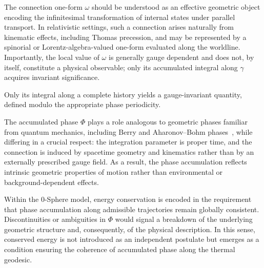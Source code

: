 \documentclass[%
 reprint,
 amsmath,amssymb,
 aps,
 prb,
]{revtex4-2}
\numberwithin{equation}{section}
\begin{document}
The connection one-form $\omega$ should be understood as an effective geometric object encoding the infinitesimal transformation of internal states under parallel transport.
In relativistic settings, such a connection arises naturally from kinematic effects, including Thomas precession, and may be represented by a spinorial or Lorentz-algebra-valued one-form evaluated along the worldline.
Importantly, the local value of $\omega$ is generally gauge dependent and does not, by itself, constitute a physical observable; only its accumulated integral along $\gamma$ acquires invariant significance.


Only its integral along a complete history yields a gauge-invariant quantity, defined modulo the appropriate phase periodicity.

The accumulated phase $\Phi$ plays a role analogous to geometric phases familiar from quantum mechanics, including Berry and Aharonov--Bohm phases~\cite{Berry1984}, while differing in a crucial respect: the integration parameter is proper time, and the connection is induced by spacetime geometry and kinematics rather than by an externally prescribed gauge field. 
As a result, the phase accumulation reflects intrinsic geometric properties of motion rather than environmental or background-dependent effects.

Within the 0-Sphere model, energy conservation is encoded in the requirement that phase accumulation along admissible trajectories remain globally consistent. 
Discontinuities or ambiguities in $\Phi$ would signal a breakdown of the underlying geometric structure and, consequently, of the physical description. 
In this sense, conserved energy is not introduced as an independent postulate but emerges as a condition ensuring the coherence of accumulated phase along the thermal geodesic.
\end{document}
